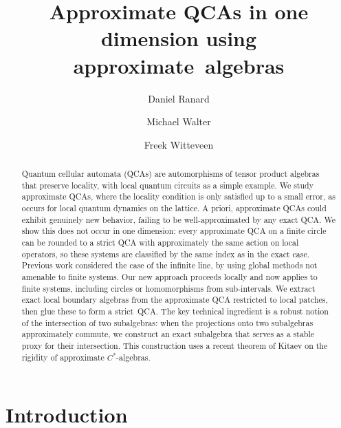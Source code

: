 \documentclass[11pt,reqno]{amsart}
\theoremstyle{definition}
\theoremstyle{remark}
\numberwithin{equation}{section}
\begin{document}
\title{Approximate QCAs in one dimension using approximate~algebras}
\date{}
\author{Daniel Ranard}
\address{California Institute of Technology, USA}
\author{Michael Walter}
\address{Ludwig-Maximiliations-Universit\"at M\"unchen \& Munich Center for Quantum Science and Technology (MCQST), Germany}
\author{Freek Witteveen}
\address{CWI, Amsterdam, The Netherlands}
\begin{abstract}
Quantum cellular automata (QCAs) are automorphisms of tensor product algebras that preserve locality, with local quantum circuits as a simple example.
We study approximate QCAs, where the locality condition is only satisfied up to a small error, as occurs for local quantum dynamics on the lattice.
A priori, approximate QCAs could exhibit genuinely new behavior, failing to be well-approximated by any exact QCA.
We show this does not occur in one dimension: every approximate QCA on a finite circle can be rounded to a strict QCA with approximately the same action on local operators, so these systems are classified by the same index as in the exact case.
Previous work considered the case of the infinite line, by using global methods not amenable to finite systems.
Our new approach proceeds locally and now applies to finite systems, including circles or homomorphisms from sub-intervals.  We extract exact local boundary algebras from the approximate QCA restricted to local patches, then glue these to form a strict~QCA.
The key technical ingredient is a robust notion of the intersection of two subalgebras: when the projections onto two subalgebras approximately commute, we construct an exact subalgebra that serves as a stable proxy for their intersection.
This construction uses a recent theorem of Kitaev on the rigidity of approximate $C^*$-algebras.
\end{abstract}
\maketitle

\section{Introduction}
\end{document}
